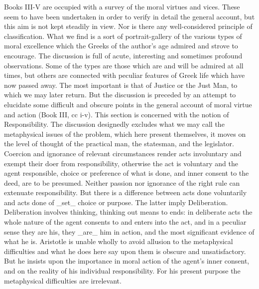 Books III-V are occupied with a survey of the moral virtues and vices.
These seem to have been undertaken in order to verify in detail the
general account, but this aim is not kept steadily in view. Nor is there
any well-considered principle of classification. What we find is a sort
of portrait-gallery of the various types of moral excellence which
the Greeks of the author's age admired and strove to encourage. The
discussion is full of acute, interesting and sometimes profound
observations. Some of the types are those which are and will be admired
at all times, but others are connected with peculiar features of Greek
life which have now passed away. The most important is that of Justice
or the Just Man, to which we may later return. But the discussion is
preceded by an attempt to elucidate some difficult and obscure points in
the general account of moral virtue and action (Book III, cc i-v). This
section is concerned with the notion of Responsibility. The discussion
designedly excludes what we may call the metaphysical issues of the
problem, which here present themselves, it moves on the level of thought
of the practical man, the statesman, and the legislator. Coercion and
ignorance of relevant circumstances render acts involuntary and exempt
their doer from responsibility, otherwise the act is voluntary and the
agent responsible, choice or preference of what is done, and inner
consent to the deed, are to be presumed. Neither passion nor ignorance
of the right rule can extenuate responsibility. But there is a
difference between acts done voluntarily and acts done of _set_ choice
or purpose. The latter imply Deliberation. Deliberation involves
thinking, thinking out means to ends: in deliberate acts the whole
nature of the agent consents to and enters into the act, and in a
peculiar sense they are his, they _are_ him in action, and the most
significant evidence of what he is. Aristotle is unable wholly to avoid
allusion to the metaphysical difficulties and what he does here say upon
them is obscure and unsatisfactory. But he insists upon the importance
in moral action of the agent's inner consent, and on the reality of his
individual responsibility. For his present purpose the metaphysical
difficulties are irrelevant.

